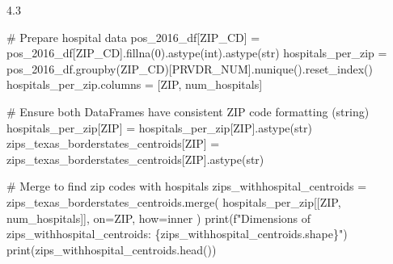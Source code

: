 \documentclass[
  letterpaper,
  DIV=11,
  numbers=noendperiod]{scrartcl}
\newenvironment{Shaded}{\begin{snugshade}}{\end{snugshade}}
\newcommand{\BuiltInTok}[1]{\textcolor[rgb]{0.00,0.23,0.31}{#1}}
\newcommand{\CommentTok}[1]{\textcolor[rgb]{0.37,0.37,0.37}{#1}}
\newcommand{\DecValTok}[1]{\textcolor[rgb]{0.68,0.00,0.00}{#1}}
\newcommand{\NormalTok}[1]{\textcolor[rgb]{0.00,0.23,0.31}{#1}}
\newcommand{\OperatorTok}[1]{\textcolor[rgb]{0.37,0.37,0.37}{#1}}
\newcommand{\SpecialCharTok}[1]{\textcolor[rgb]{0.37,0.37,0.37}{#1}}
\newcommand{\SpecialStringTok}[1]{\textcolor[rgb]{0.13,0.47,0.30}{#1}}
\newcommand{\StringTok}[1]{\textcolor[rgb]{0.13,0.47,0.30}{#1}}
\begin{document}
4.3

\begin{Shaded}
\begin{Highlighting}[]
\CommentTok{\# Prepare hospital data}
\NormalTok{pos\_2016\_df[}\StringTok{\textquotesingle{}ZIP\_CD\textquotesingle{}}\NormalTok{] }\OperatorTok{=}\NormalTok{ pos\_2016\_df[}\StringTok{\textquotesingle{}ZIP\_CD\textquotesingle{}}\NormalTok{].fillna(}\DecValTok{0}\NormalTok{).astype(}\BuiltInTok{int}\NormalTok{).astype(}\BuiltInTok{str}\NormalTok{)}
\NormalTok{hospitals\_per\_zip }\OperatorTok{=}\NormalTok{ pos\_2016\_df.groupby(}\StringTok{\textquotesingle{}ZIP\_CD\textquotesingle{}}\NormalTok{)[}\StringTok{\textquotesingle{}PRVDR\_NUM\textquotesingle{}}\NormalTok{].nunique().reset\_index()}
\NormalTok{hospitals\_per\_zip.columns }\OperatorTok{=}\NormalTok{ [}\StringTok{\textquotesingle{}ZIP\textquotesingle{}}\NormalTok{, }\StringTok{\textquotesingle{}num\_hospitals\textquotesingle{}}\NormalTok{]}

\CommentTok{\# Ensure both DataFrames have consistent ZIP code formatting (string)}
\NormalTok{hospitals\_per\_zip[}\StringTok{\textquotesingle{}ZIP\textquotesingle{}}\NormalTok{] }\OperatorTok{=}\NormalTok{ hospitals\_per\_zip[}\StringTok{\textquotesingle{}ZIP\textquotesingle{}}\NormalTok{].astype(}\BuiltInTok{str}\NormalTok{)}
\NormalTok{zips\_texas\_borderstates\_centroids[}\StringTok{\textquotesingle{}ZIP\textquotesingle{}}\NormalTok{] }\OperatorTok{=}\NormalTok{ zips\_texas\_borderstates\_centroids[}\StringTok{\textquotesingle{}ZIP\textquotesingle{}}\NormalTok{].astype(}\BuiltInTok{str}\NormalTok{)}

\CommentTok{\# Merge to find zip codes with hospitals}
\NormalTok{zips\_withhospital\_centroids }\OperatorTok{=}\NormalTok{ zips\_texas\_borderstates\_centroids.merge(}
\NormalTok{    hospitals\_per\_zip[[}\StringTok{\textquotesingle{}ZIP\textquotesingle{}}\NormalTok{, }\StringTok{\textquotesingle{}num\_hospitals\textquotesingle{}}\NormalTok{]], on}\OperatorTok{=}\StringTok{\textquotesingle{}ZIP\textquotesingle{}}\NormalTok{, how}\OperatorTok{=}\StringTok{\textquotesingle{}inner\textquotesingle{}}
\NormalTok{)}
\BuiltInTok{print}\NormalTok{(}\SpecialStringTok{f"Dimensions of zips\_withhospital\_centroids: }\SpecialCharTok{\{}\NormalTok{zips\_withhospital\_centroids}\SpecialCharTok{.}\NormalTok{shape}\SpecialCharTok{\}}\SpecialStringTok{"}\NormalTok{)}
\BuiltInTok{print}\NormalTok{(zips\_withhospital\_centroids.head())}
\end{Highlighting}
\end{Shaded}
\end{document}
